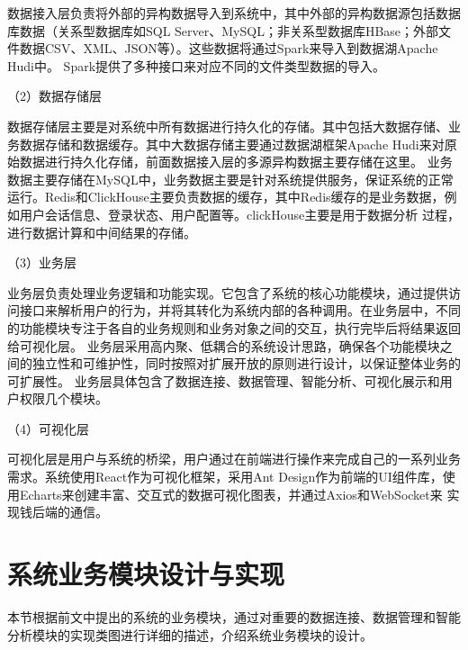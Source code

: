 数据接入层负责将外部的异构数据导入到系统中，其中外部的异构数据源包括数据库数据（关系型数据库如SQL Server、MySQL；非关系型数据库HBase；外部文件数据CSV、XML、JSON等）。这些数据将通过Spark来导入到数据湖Apache Hudi中。
Spark提供了多种接口来对应不同的文件类型数据的导入。

（2）数据存储层

数据存储层主要是对系统中所有数据进行持久化的存储。其中包括大数据存储、业务数据存储和数据缓存。其中大数据存储主要通过数据湖框架Apache Hudi来对原始数据进行持久化存储，前面数据接入层的多源异构数据主要存储在这里。
业务数据主要存储在MySQL中，业务数据主要是针对系统提供服务，保证系统的正常运行。Redis和ClickHouse主要负责数据的缓存，其中Redis缓存的是业务数据，例如用户会话信息、登录状态、用户配置等。clickHouse主要是用于数据分析
过程，进行数据计算和中间结果的存储。

（3）业务层 

业务层负责处理业务逻辑和功能实现。它包含了系统的核心功能模块，通过提供访问接口来解析用户的行为，并将其转化为系统内部的各种调用。在业务层中，不同的功能模块专注于各自的业务规则和业务对象之间的交互，执行完毕后将结果返回给可视化层。
业务层采用高内聚、低耦合的系统设计思路，确保各个功能模块之间的独立性和可维护性，同时按照对扩展开放的原则进行设计，以保证整体业务的可扩展性。
业务层具体包含了数据连接、数据管理、智能分析、可视化展示和用户权限几个模块。

（4）可视化层

可视化层是用户与系统的桥梁，用户通过在前端进行操作来完成自己的一系列业务需求。系统使用React作为可视化框架，采用Ant Design作为前端的UI组件库，使用Echarts来创建丰富、交互式的数据可视化图表，并通过Axios和WebSocket来
实现钱后端的通信。

\section{系统业务模块设计与实现}
本节根据前文中提出的系统的业务模块，通过对重要的数据连接、数据管理和智能分析模块的实现类图进行详细的描述，介绍系统业务模块的设计。
